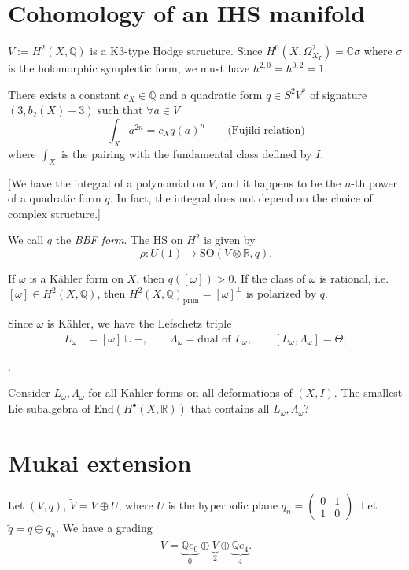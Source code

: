 \section{Cohomology of an IHS manifold}
\label{section-cohomology-ihs}

\noindent
$V:=H^2(X,\mathbb{Q})$ is a K3-type Hodge
structure.
Since
$H^0(X,\Omega_{X_T}^2)=\mathbb{C}\sigma$
where $\sigma$ is the holomorphic symplectic
form,
we must have $h^{2,0}=h^{0,2}=1$.

\begin{theorem}
\label{theorem-bbf}
There exists a constant $c_X \in \mathbb{Q}$
and a quadratic form
$q \in S^2V^*$ of signature $(3,b_2(X)-3)$
such that $\forall  a \in V$
$$
\int_X a^{2n}=c_X q(a)^n \qquad \text{(Fujiki
relation)}
$$
where $\int_X$ is the pairing with the
fundamental class
defined by $I$.
\end{theorem}

[We have the integral of a polynomial on $V$,
and it happens to be the $n$-th power of a
quadratic form $q$.
In fact, the integral does not depend on the
choice of complex
structure.]


We call $q$ the  {\it BBF form}.
The HS on $H^2$ is given by
$$
\rho:U(1) \to \text{SO}(V\otimes
\mathbb{R},q).
$$

If $\omega$ is a Kähler form on $X$,
then $q([\omega])>0$.
If the class of  $\omega$ is rational,
i.e. $[\omega] \in H^2(X,\mathbb{Q})$,
then
$H^2(X,\mathbb{Q})_{\text{prim}}=[\omega]
^\perp$
is polarized by $q$.

Since $\omega$ is Kähler, we have the
Lefschetz triple
$$
\begin{aligned}
L_\omega&=[\omega] \cup  -,\qquad
\Lambda_\omega=\text{dual of }L_\omega,
\qquad [L_\omega,\Lambda_\omega]=\Theta,
\end{aligned}
$$

.

Consider $L_\omega, \Lambda_\omega$ for all
Kähler forms
on all deformations of  $(X,I)$.
The smallest Lie subalgebra of
$\text{End}(H^\bullet(X,\mathbb{R}))$
that contains all $L_\omega,\Lambda_\omega$?

\section{Mukai extension}
\label{section-mukai-extension}

\noindent
Let $(V,q)$, $\tilde{V}=V \oplus U$,
where $U$ is the hyperbolic plane
$q_n=\begin{pmatrix}0&1\\ 1&0\end{pmatrix}$.
Let $\tilde{q}=q \oplus q_n$.
We have a grading
$$
\tilde{V}=\underbrace{\mathbb{Q}e_0}_{0}
\oplus
\underbrace{V}_{2}
\oplus\underbrace{\mathbb{Q}e_4}_{4}.
$$

